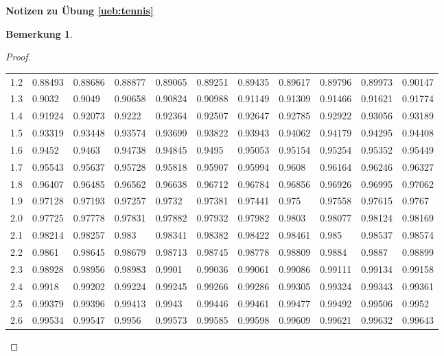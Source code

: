 \documentclass[%
<<<<<<< Updated upstream
11pt,%
twoside,%
titlepage,%
german,%
=======
11pt,%
twoside,%
titlepage,%
swissgerman,%
>>>>>>> Stashed changes
headsepline%
]{scrartcl}
\newcommand{\faReturnGray}{\textcolor{gray}{\faMailReply}} %
\newcommand{\spaltenheight}{\rule{0mm}{3ex}}
\theoremstyle{definition}
\newtheorem{bem}{Bemerkung}[subsection] %
\theoremstyle{plain}
\newcommand{\concatueb}[1]{ueb:#1}%
\newcommand{\concatlsg}[1]{lsg:#1}%
\newenvironment{lsg}[1]{%
    \par\noindent\textbf{Notizen zu Übung \ref{\concatueb{#1}}}\label{\concatlsg{#1}}
    \hfill\hyperref[\concatueb{#1}]{\faReturnGray}\par %
}{%
    \par%
}
\newcounter{theo}[section]\setcounter{theo}{0}
\newcommand{\concatueb}[1]{ueb:#1}%
\newcommand{\concatlsg}[1]{lsg:#1}%
\newenvironment{lsg}[1]{%
    \par\noindent\textbf{Notizen zu Übung \ref{\concatueb{#1}}.}%
    \label{\concatlsg{#1}}
}{%
    \par%
}
\begin{document}
\begin{lsg}{tennis}
\begin{bem}
\begin{proof}
\begin{table}[]
{\begin{tabular}{l|llllllllll}
\rowcolor{lightyellow}\spaltenheight 1.2 & 0.88493 & 0.88686 & 0.88877 & 0.89065 & 0.89251 & 0.89435 & 0.89617 & 0.89796 & 0.89973 & 0.90147 \\
\rowcolor{Gray}\spaltenheight 1.3 & 0.9032  & 0.9049  & 0.90658 & 0.90824 & 0.90988 & 0.91149 & 0.91309 & 0.91466 & 0.91621 & 0.91774 \\
\rowcolor{lightyellow}\spaltenheight 1.4 & 0.91924 & 0.92073 & 0.9222  & 0.92364 & 0.92507 & 0.92647 & 0.92785 & 0.92922 & 0.93056 & 0.93189 \\
\rowcolor{Gray}\spaltenheight 1.5 & 0.93319 & 0.93448 & 0.93574 & 0.93699 & 0.93822 & 0.93943 & 0.94062 & 0.94179 & 0.94295 & 0.94408 \\
\rowcolor{lightyellow}\spaltenheight 1.6 & 0.9452  & 0.9463  & 0.94738 & 0.94845 & 0.9495  & 0.95053 & 0.95154 & 0.95254 & 0.95352 & 0.95449 \\
\rowcolor{Gray}\spaltenheight 1.7 & 0.95543 & 0.95637 & 0.95728 & 0.95818 & 0.95907 & 0.95994 & 0.9608  & 0.96164 & 0.96246 & 0.96327 \\
\rowcolor{lightyellow}\spaltenheight 1.8 & 0.96407 & 0.96485 & 0.96562 & 0.96638 & 0.96712 & 0.96784 & 0.96856 & 0.96926 & 0.96995 & 0.97062 \\
\rowcolor{Gray}\spaltenheight 1.9 & 0.97128 & 0.97193 & 0.97257 & 0.9732  & 0.97381 & 0.97441 & 0.975   & 0.97558 & 0.97615 & 0.9767  \\
\rowcolor{lightyellow}\spaltenheight 2.0   & 0.97725 & 0.97778 & 0.97831 & 0.97882 & 0.97932 & 0.97982 & 0.9803  & 0.98077 & 0.98124 & 0.98169 \\
\rowcolor{Gray}\spaltenheight 2.1 & 0.98214 & 0.98257 & 0.983   & 0.98341 & 0.98382 & 0.98422 & 0.98461 & 0.985   & 0.98537 & 0.98574 \\
\rowcolor{lightyellow}\spaltenheight 2.2 & 0.9861  & 0.98645 & 0.98679 & 0.98713 & 0.98745 & 0.98778 & 0.98809 & 0.9884  & 0.9887  & 0.98899 \\
\rowcolor{Gray}\spaltenheight 2.3 & 0.98928 & 0.98956 & 0.98983 & 0.9901  & 0.99036 & 0.99061 & 0.99086 & 0.99111 & 0.99134 & 0.99158 \\
\rowcolor{lightyellow}\spaltenheight 2.4 & 0.9918  & 0.99202 & 0.99224 & 0.99245 & 0.99266 & 0.99286 & 0.99305 & 0.99324 & 0.99343 & 0.99361 \\
\rowcolor{Gray}\spaltenheight 2.5 & 0.99379 & 0.99396 & 0.99413 & 0.9943  & 0.99446 & 0.99461 & 0.99477 & 0.99492 & 0.99506 & 0.9952  \\
\rowcolor{lightyellow}\spaltenheight 2.6 & 0.99534 & 0.99547 & 0.9956  & 0.99573 & 0.99585 & 0.99598 & 0.99609 & 0.99621 & 0.99632 & 0.99643 \\

\end{tabular}}
\end{table}
\end{proof}
\end{bem}
\end{lsg}
\end{document}
